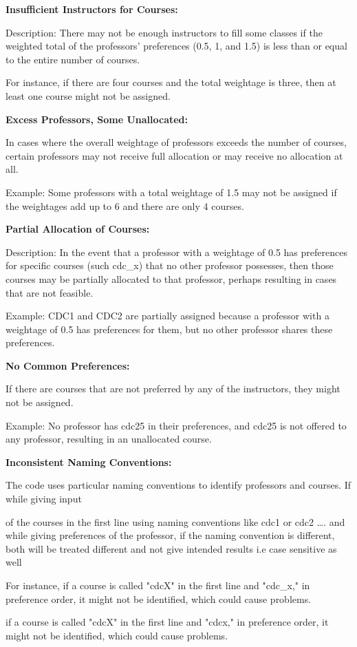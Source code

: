 \documentclass{article} %
\begin{document}


\noindent \textbf{Insufficient Instructors for Courses:}

\noindent Description: There may not be enough instructors to fill some classes if the weighted total of the professors' preferences (0.5, 1, and 1.5) is less than or equal to the entire number of courses.

\noindent For instance, if there are four courses and the total weightage is three, then at least one course might not be assigned.

\noindent 

\noindent \textbf{Excess Professors, Some Unallocated:}

\noindent In cases where the overall weightage of professors exceeds the number of courses, certain professors may not receive full allocation or may receive no allocation at all.

\noindent Example: Some professors with a total weightage of 1.5 may not be assigned if the weightages add up to 6 and there are only 4 courses.

\noindent 

\noindent \textbf{Partial Allocation of Courses:}

\noindent Description: In the event that a professor with a weightage of 0.5 has preferences for specific courses (such cdc\_x) that no other professor possesses, then those courses may be partially allocated to that professor, perhaps resulting in cases that are not feasible.

\noindent Example: CDC1 and CDC2 are partially assigned because a professor with a weightage of 0.5 has preferences for them, but no other professor shares these preferences.

\noindent 

\noindent \textbf{No Common Preferences:}

\noindent If there are courses that are not preferred by any of the instructors, they might not be assigned.

\noindent Example: No professor has cdc25 in their preferences, and cdc25 is not offered to any professor, resulting in an unallocated course.

\noindent 

\noindent \textbf{Inconsistent Naming Conventions:}

\noindent The code uses particular naming conventions to identify professors and courses. If while giving input

\noindent of the courses in the first line using naming conventions like cdc1 or cdc2 {\dots}. and while giving preferences of the professor, if the naming convention is different, both will be treated different and not give intended results i.e case sensitive as well

\noindent For instance, if a course is called "cdcX" in the first line and "cdc\_x," in preference order, it might not be identified, which could cause problems.

\noindent if a course is called "cdcX" in the first line and "cdcx," in preference order, it might not be identified, which could cause problems.

\noindent 
\end{document}
